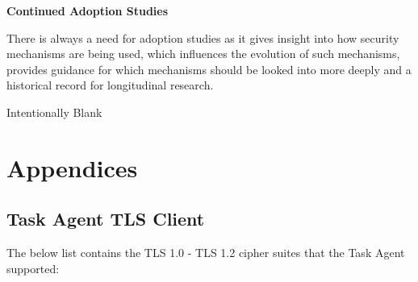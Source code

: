 \documentclass{mscreport}
\begin{document}
\vspace{0.7cm} \noindent
\textbf{Continued Adoption Studies}

\noindent
There is always a need for adoption studies as it gives insight into how security mechanisms are being used, which influences the evolution of such mechanisms, provides guidance for which mechanisms should be looked into more deeply and a historical record for longitudinal research.

\newpage


\vspace*{\fill}
\begin{center}
\begin{huge}
Intentionally Blank
\end{huge}
\end{center}
\vspace{\fill}

\newpage






\newpage
\chapter*{Appendices}
\appendix
\renewcommand\thesection{\Alph{section}}
\section{Task Agent TLS Client}
\noindent
The below list contains the TLS 1.0 - TLS 1.2 cipher suites that the Task Agent supported:
\end{document}
